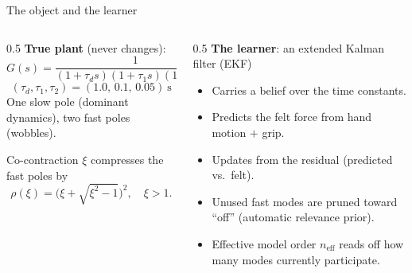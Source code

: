 \documentclass[aspectratio=169, 11pt]{beamer}
\begin{document}
\begin{frame}{The object and the learner}
\begin{columns}[T]
\begin{column}{0.5\linewidth}
\textbf{True plant} (never changes):
\[
G(s)=\frac{1}{(1+\tau_d s)(1+\tau_1 s)(1+\tau_2 s)}
\]
\[
(\tau_d,\tau_1,\tau_2) = (1.0,\,0.1,\,0.05)\ \mathrm{s}
\]
One slow pole (dominant dynamics), two fast poles (wobbles).
\vspace{6pt}

Co-contraction $\xi$ compresses the fast poles by
\[
\rho(\xi) = \bigl(\xi+\sqrt{\xi^2-1}\bigr)^2,\quad \xi>1.
\]
\end{column}
\begin{column}{0.5\linewidth}
\textbf{The learner}: an extended Kalman filter (EKF)
\begin{itemize}
  \item Carries a belief over the time constants.
  \item Predicts the felt force from hand motion $+$ grip.
  \item Updates from the residual (predicted vs.\ felt).
  \item Unused fast modes are pruned toward ``off''
        (automatic relevance prior).
  \item Effective model order $n_{\mathrm{eff}}$ reads off how many
        modes currently participate.
\end{itemize}
\end{column}
\end{columns}
\end{frame}
\end{document}
